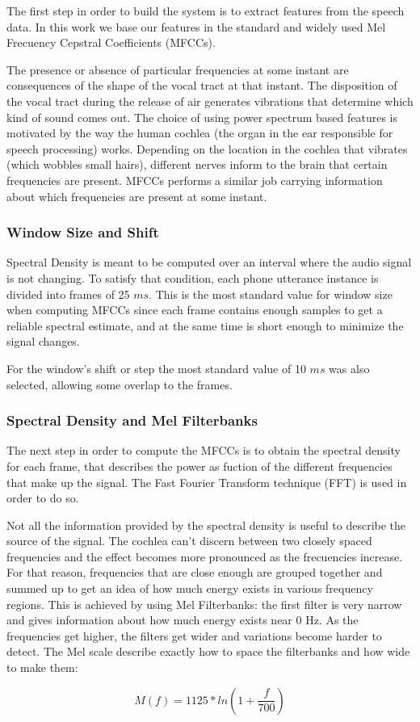 The first step in order to build the system is to extract features from the speech data. In this
work we base our features in the standard and widely used Mel Frecuency Cepstral Coefficients 
(MFCCs).

The presence or absence of particular frequencies at some instant are consequences of the shape of
the vocal tract at that instant. The disposition of the vocal tract during the 
release of air generates vibrations 
that determine which kind of sound comes out.
The choice of using power spectrum based features is motivated by
the way the human cochlea (the organ in the ear responsible for speech processing) works.
Depending on the location in the cochlea that vibrates (which wobbles small hairs), 
different nerves inform to the brain that certain frequencies are present. 
MFCCs performs a similar job carrying information about which frequencies are present at
some instant. 


\subsubsection{Window Size and Shift}

Spectral Density is meant to be computed over an interval where the audio signal is not changing.
To satisfy that condition, each phone utterance instance is divided into frames of 25 $ms$. 
This is the most standard value for window size when computing MFCCs since 
each frame contains enough samples to get a reliable spectral estimate, and at the same time is
short enough to minimize the signal changes.

For the window's shift or step the most standard value of 10 $ms$ was also selected, allowing some
overlap to the frames.


\subsubsection{Spectral Density and Mel Filterbanks}

The next step in order to compute the MFCCs is to obtain the spectral density for each frame,
that describes the power as fuction of the different frequencies that make up the signal.
The Fast Fourier Transform technique (FFT) is used in order to do so. 

Not all the information provided by the spectral density is useful to describe the source
of the signal. The cochlea can't discern between two closely spaced frequencies and the
effect becomes more pronounced as the frecuencies increase. For that reason, frequencies
that are close enough are grouped together and summed up to get an idea of how much energy
exists in various frequency regions. This is achieved by using Mel Filterbanks: 
the first filter is very narrow and gives information about how much energy exists near 0 Hz.
As the frequencies get higher, the filters get wider and variations become harder to 
detect. The Mel scale describe exactly how to space the filterbanks and how wide to make them:

\begin{equation}
M(f)=1125*ln(1 + \frac{f}{700})
\end{equation}




